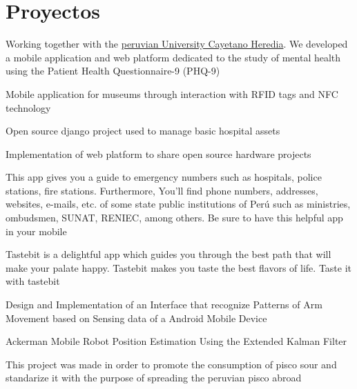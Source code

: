 \section{Proyectos}

{Working together with the \href{http://www.upch.edu.pe/portal/}{peruvian University Cayetano Heredia}. We developed a mobile application and web platform dedicated to the study of mental health using the Patient Health Questionnaire-9 (PHQ-9)}  

{Mobile application for museums through interaction with RFID tags and NFC technology}  

{Open source django project used to manage basic hospital assets}  

{Implementation of web platform to share open source hardware projects}  

{This app gives you a guide to emergency numbers such as hospitals, police stations, fire stations. Furthermore, You'll find phone numbers, addresses, websites, e-mails, etc. of some state public institutions of Perú such as ministries, ombudsmen, SUNAT, RENIEC, among others. Be sure to have this helpful app in your mobile}  

{Tastebit is a delightful app which guides you through the best path that will make your palate happy. Tastebit makes you taste the best flavors of life. Taste it with tastebit}  

{Design and Implementation of an Interface that recognize Patterns of Arm Movement based on Sensing data of a Android Mobile Device}

{Ackerman Mobile Robot Position Estimation Using the Extended Kalman Filter} 

{This project was made in order to promote the consumption of pisco sour and standarize it with the purpose of spreading the peruvian pisco abroad}
